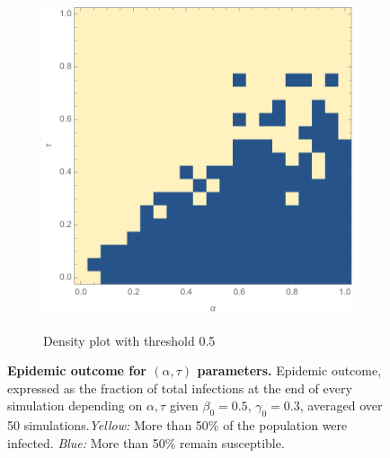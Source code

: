 \documentclass[11pt]{article}
\begin{document}
\begin{figure}[t]
\begin{subfigure}[b]{0.45\textwidth}
    	\includegraphics[width=\textwidth]{alpha_tau_omega1_beta05_gamma03_expk2_runs50_cut50_notitle.pdf}
        \label{fig:alphataucut}
	    \caption{Density plot with threshold 0.5}
	\end{subfigure}
    \caption{\textbf{Epidemic outcome for $(\alpha,\tau)$ parameters.} Epidemic outcome, expressed as the fraction of total infections at the end of every simulation depending on $\alpha,\tau$ given $\beta_{0}=0.5$, $\gamma_{0}=0.3$, averaged over 50 simulations.\textit{Yellow:} More than 50\% of the population were infected. \textit{Blue:} More than 50\% remain susceptible.}
    \label{fig:alphatau}
\end{figure}
\end{document}
